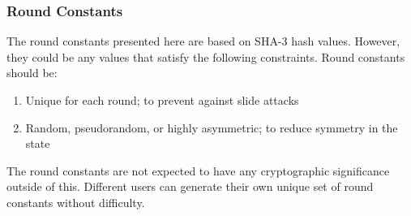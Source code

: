 \subsubsection{Round Constants}
The round constants presented here are based on SHA-3 hash values.
However, they could be any values that satisfy the following constraints.
Round constants should be:
\begin{enumerate}
\item Unique for each round; to prevent against slide attacks
\item Random, pseudorandom, or highly asymmetric; to reduce symmetry in the state
\end{enumerate}
The round constants are not expected to have any cryptographic significance outside of this.
Different users can generate their own unique set of round constants without difficulty.

